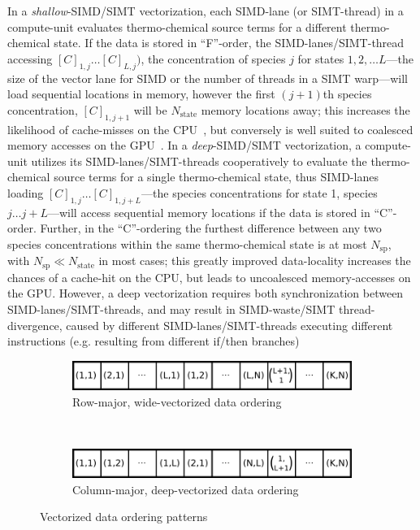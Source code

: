 \documentclass[12pt,number,sort&compress]{elsarticle}
\begin{document}
In a \textit{shallow}-SIMD\slash SIMT vectorization, each SIMD-lane (or SIMT-thread) in a compute-unit evaluates thermo-chemical source terms for a different thermo-chemical state.
If the data is stored in ``F''-order, the SIMD-lanes\slash SIMT-thread accessing $[C]_{1, j}\ldots[C]_{L, j})$, the concentration of species $j$ for states $1, 2,\ldots L$---the size of the vector lane for SIMD or the number of threads in a SIMT warp---will load sequential locations in memory, however the first $(j+1)$th species concentration, $[C]_{1, j+1}$ will be $N_{\text{state}}$ memory locations away; this increases the likelihood of cache-misses on the CPU~\cite{gray2000rules}, but conversely is well suited to coalesced memory accesses on the GPU~\cite{NVIDIA:2018}.
In a \textit{deep}-SIMD\slash SIMT vectorization, a compute-unit utilizes its SIMD-lanes\slash SIMT-threads cooperatively to evaluate the thermo-chemical source terms for a single thermo-chemical state, thus SIMD-lanes loading $[C]_{1, j} \ldots [C]_{1, j + L}$---the species concentrations for state 1, species $j \ldots j + L$---will access sequential memory locations if the data is stored in ``C''-order.
Further, in the ``C''-ordering the furthest difference between any two species concentrations within the same thermo-chemical state is at most $N_{\text{sp}}$, with $N_{\text{sp}} \ll N_{\text{state}}$ in most cases; this greatly improved data-locality increases the chances of a cache-hit on the CPU, but leads to uncoalesced memory-accesses on the GPU.
However, a deep vectorization requires both synchronization between SIMD-lanes\slash SIMT-threads, and may result in SIMD-waste\slash SIMT thread-divergence, caused by different SIMD-lanes\slash SIMT-threads executing different instructions (e.g. resulting from different if\slash then branches)

\begin{figure}[htb]
  \centering
  \begin{minipage}{0.6\linewidth}
    \begin{subfigure}[t]{\textwidth}
	\includegraphics[width=\textwidth]{row_major_split.pdf}
	\caption{Row-major, wide-vectorized data ordering}
	\label{F:row_major_split}
    \end{subfigure}
    \\
    \begin{subfigure}[t]{\textwidth}
	\includegraphics[width=\textwidth]{column_major_split.pdf}
	\caption{Column-major, deep-vectorized data ordering}
	\label{F:column_major_split}
    \end{subfigure}
  \end{minipage}
  \caption{Vectorized data ordering patterns}
  \label{F:vector_data}
\end{figure}
\end{document}
